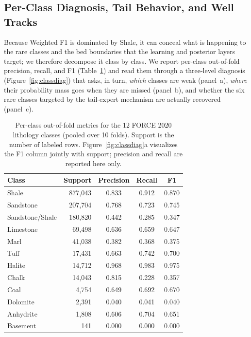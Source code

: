 \documentclass[bdcc,article,submit,pdftex,moreauthors]{Definitions/mdpi}
\begin{document}
\subsection{Per-Class Diagnosis, Tail Behavior, and Well Tracks}
\label{sec:rq4}
Because Weighted F1 is dominated by Shale, it can conceal what is happening to the rare classes
and the bed boundaries that the learning and posterior layers target; we therefore decompose it
class by class. We report per-class out-of-fold precision,
recall, and F1 (Table~\ref{tab:perclass}) and read them through a three-level diagnosis
(Figure~\ref{fig:classdiag}) that asks, in turn, \emph{which} classes are weak (panel~a),
\emph{where} their probability mass goes when they are missed (panel~b), and whether the six
rare classes targeted by the tail-expert mechanism are actually recovered (panel~c).

\begin{table}[H]
\caption{Per-class out-of-fold metrics for the 12 FORCE 2020 lithology classes (pooled over
10 folds). Support is the number of labeled rows. Figure~\ref{fig:classdiag}a visualizes the
F1 column jointly with support; precision and recall are reported here
only.\label{tab:perclass}}
\begin{tabularx}{\textwidth}{Xrccc}
\toprule
\textbf{Class} & \textbf{Support} & \textbf{Precision} & \textbf{Recall} & \textbf{F1}\\
\midrule
Shale & 877{,}043 & 0.833 & 0.912 & 0.870\\
Sandstone & 207{,}704 & 0.768 & 0.723 & 0.745\\
Sandstone/Shale & 180{,}820 & 0.442 & 0.285 & 0.347\\
Limestone & 69{,}498 & 0.636 & 0.659 & 0.647\\
Marl & 41{,}038 & 0.382 & 0.368 & 0.375\\
Tuff & 17{,}431 & 0.663 & 0.742 & 0.700\\
Halite & 14{,}712 & 0.968 & 0.983 & 0.975\\
Chalk & 14{,}043 & 0.815 & 0.228 & 0.357\\
Coal & 4{,}754 & 0.649 & 0.692 & 0.670\\
Dolomite & 2{,}391 & 0.040 & 0.041 & 0.040\\
Anhydrite & 1{,}808 & 0.606 & 0.704 & 0.651\\
Basement & 141 & 0.000 & 0.000 & 0.000\\
\bottomrule
\end{tabularx}
\end{table}
\end{document}
